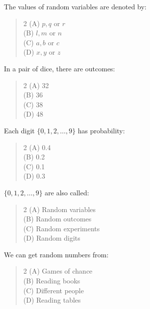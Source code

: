 \documentclass[11pt,a4paper]{article}
\begin{document}
\begin{mcqlist}
\item The values of random variables are denoted by:
\begin{quote}\begin{multicols}{2}
\noindent (A) $p, q$ or $r$ \\
(B) $l, m$ or $n$ \\
(C) $a, b$ or $c$ \\
(D) $x, y$ or $z$
\end{multicols}\end{quote}

\item In a pair of dice, there are outcomes:
\begin{quote}\begin{multicols}{2}
\noindent (A) 32 \\
(B) 36 \\
(C) 38 \\
(D) 48
\end{multicols}\end{quote}

\item Each digit $\{0,1,2,\ldots,9\}$ has probability:
\begin{quote}\begin{multicols}{2}
\noindent (A) 0.4 \\
(B) 0.2 \\
(C) 0.1 \\
(D) 0.3
\end{multicols}\end{quote}

\item $\{0,1,2,\ldots,9\}$ are also called:
\begin{quote}\begin{multicols}{2}
\noindent (A) Random variables \\
(B) Random outcomes \\
(C) Random experiments \\
(D) Random digits
\end{multicols}\end{quote}

\item We can get random numbers from:
\begin{quote}\begin{multicols}{2}
\noindent (A) Games of chance \\
(B) Reading books \\
(C) Different people \\
(D) Reading tables
\end{multicols}\end{quote}


\end{mcqlist}
\end{document}
